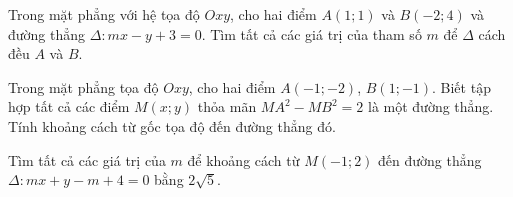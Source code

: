 	\begin{vd}%
		Trong mặt phẳng với hệ tọa độ $Oxy$, cho hai điểm $A(1;1)$ và $B(-2;4)$ và đường thẳng $\Delta\colon mx-y+3=0$. Tìm tất cả các giá trị của tham số $m$ để $\Delta$ cách đều $A$ và $B$.
	\end{vd}
	\begin{vd}%
		Trong mặt phẳng tọa độ $Oxy$, cho hai điểm $A(-1;-2)$, $B(1;-1)$. Biết tập hợp tất cả các điểm $M(x;y)$ thỏa mãn $MA^2-MB^2=2$ là một đường thẳng. Tính khoảng cách từ gốc tọa độ đến đường thẳng đó.
	\end{vd}
	\begin{vd}%
		Tìm tất cả các giá trị của $m$ để khoảng cách từ $M(-1;2)$ đến đường thẳng $\Delta \colon mx+y-m+4=0$ bằng $2\sqrt{5}$.
	\end{vd}
	
